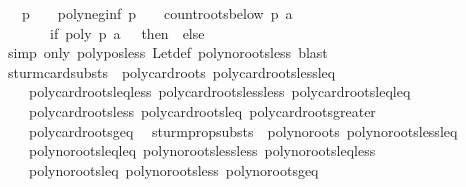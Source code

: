 \begin{isabellebody}
\ \ \ p\ {\isasymnoteq}\ {}\ {\isasymand}\ poly{\isacharunderscore}neg{\isacharunderscore}inf\ p\ {\isacharequal}\ {}\ {\isasymand}\ count{\isacharunderscore}roots{\isacharunderscore}below\ p\ a\ {\isacharequal}\ \isanewline
\ \ \ \ \ \ \ {\isacharparenleft}if\ poly\ p\ a\ {\isacharequal}\ {}\ then\ {}\ else\ {}{\isacharparenright}{\isacharparenright}{\isachardoublequoteclose}\isanewline
%
\isadelimproof
\ \ %
\endisadelimproof
%
\isatagproof
{}\isamarkupfalse%
\ {\isacharparenleft}simp\ only{\isacharcolon}\ poly{\isacharunderscore}pos{\isacharunderscore}less\ Let{\isacharunderscore}def\ poly{\isacharunderscore}no{\isacharunderscore}roots{\isacharunderscore}less{\isacharcomma}\ blast{\isacharparenright}%
\endisatagproof
{\isafoldproof}%
%
\isadelimproof
\isanewline
%
\endisadelimproof
\isanewline
\isanewline
{}\isamarkupfalse%
\ sturm{\isacharunderscore}card{\isacharunderscore}substs\ {\isacharequal}\ poly{\isacharunderscore}card{\isacharunderscore}roots\ poly{\isacharunderscore}card{\isacharunderscore}roots{\isacharunderscore}less{\isacharunderscore}leq\ \isanewline
\ \ \ \ poly{\isacharunderscore}card{\isacharunderscore}roots{\isacharunderscore}leq{\isacharunderscore}less\ poly{\isacharunderscore}card{\isacharunderscore}roots{\isacharunderscore}less{\isacharunderscore}less\ poly{\isacharunderscore}card{\isacharunderscore}roots{\isacharunderscore}leq{\isacharunderscore}leq\isanewline
\ \ \ \ poly{\isacharunderscore}card{\isacharunderscore}roots{\isacharunderscore}less\ poly{\isacharunderscore}card{\isacharunderscore}roots{\isacharunderscore}leq\ poly{\isacharunderscore}card{\isacharunderscore}roots{\isacharunderscore}greater\isanewline
\ \ \ \ poly{\isacharunderscore}card{\isacharunderscore}roots{\isacharunderscore}geq\ \isanewline
\isanewline
{}\isamarkupfalse%
\ sturm{\isacharunderscore}prop{\isacharunderscore}substs\ {\isacharequal}\ poly{\isacharunderscore}no{\isacharunderscore}roots\ poly{\isacharunderscore}no{\isacharunderscore}roots{\isacharunderscore}less{\isacharunderscore}leq\ \isanewline
\ \ \ \ poly{\isacharunderscore}no{\isacharunderscore}roots{\isacharunderscore}leq{\isacharunderscore}leq\ poly{\isacharunderscore}no{\isacharunderscore}roots{\isacharunderscore}less{\isacharunderscore}less\ poly{\isacharunderscore}no{\isacharunderscore}roots{\isacharunderscore}leq{\isacharunderscore}less\isanewline
\ \ \ \ poly{\isacharunderscore}no{\isacharunderscore}roots{\isacharunderscore}leq\ poly{\isacharunderscore}no{\isacharunderscore}roots{\isacharunderscore}less\ poly{\isacharunderscore}no{\isacharunderscore}roots{\isacharunderscore}geq\ \isanewline

\end{isabellebody}
